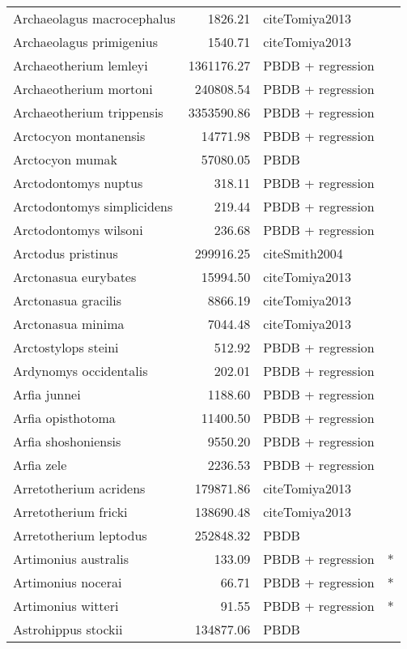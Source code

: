 \begin{table}[ht]
\begin{tabular}{lrll}
  Archaeolagus macrocephalus & 1826.21 & cite{Tomiya2013} &  \\ 
  Archaeolagus primigenius & 1540.71 & cite{Tomiya2013} &  \\ 
  Archaeotherium lemleyi & 1361176.27 & PBDB + regression &  \\ 
  Archaeotherium mortoni & 240808.54 & PBDB + regression &  \\ 
  Archaeotherium trippensis & 3353590.86 & PBDB + regression &  \\ 
  Arctocyon montanensis & 14771.98 & PBDB + regression &  \\ 
  Arctocyon mumak & 57080.05 & PBDB &  \\ 
  Arctodontomys nuptus & 318.11 & PBDB + regression &  \\ 
  Arctodontomys simplicidens & 219.44 & PBDB + regression &  \\ 
  Arctodontomys wilsoni & 236.68 & PBDB + regression &  \\ 
  Arctodus pristinus & 299916.25 & cite{Smith2004} &  \\ 
  Arctonasua eurybates & 15994.50 & cite{Tomiya2013} &  \\ 
  Arctonasua gracilis & 8866.19 & cite{Tomiya2013} &  \\ 
  Arctonasua minima & 7044.48 & cite{Tomiya2013} &  \\ 
  Arctostylops steini & 512.92 & PBDB + regression &  \\ 
  Ardynomys occidentalis & 202.01 & PBDB + regression &  \\ 
  Arfia junnei & 1188.60 & PBDB + regression &  \\ 
  Arfia opisthotoma & 11400.50 & PBDB + regression &  \\ 
  Arfia shoshoniensis & 9550.20 & PBDB + regression &  \\ 
  Arfia zele & 2236.53 & PBDB + regression &  \\ 
  Arretotherium acridens & 179871.86 & cite{Tomiya2013} &  \\ 
  Arretotherium fricki & 138690.48 & cite{Tomiya2013} &  \\ 
  Arretotherium leptodus & 252848.32 & PBDB &  \\ 
  Artimonius australis & 133.09 & PBDB + regression & * \\ 
  Artimonius nocerai & 66.71 & PBDB + regression & * \\ 
  Artimonius witteri & 91.55 & PBDB + regression & * \\ 
  Astrohippus stockii & 134877.06 & PBDB &  \\ 

\end{tabular}
\end{table}
